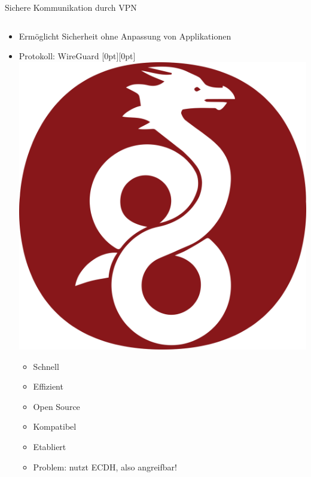 \documentclass{rosenpass-beamer}
\begin{document}
\begin{frame}{Sichere Kommunikation durch VPN}
\begin{columns}[T]
\begin{column}{0.5\textwidth}
\begin{itemize}
\item  Ermöglicht Sicherheit ohne Anpassung von Applikationen
\item  Protokoll: WireGuard \raisebox{\dimexpr-.5\height+.5\ht\strutbox}[0pt][0pt]{\includegraphics[height=1.5\baselineskip]{graphics/wireguard}}

  \begin{itemize}
    \item Schnell
  \item Effizient
  \item Open Source
  \item Kompatibel
  \item Etabliert
  \item Problem: nutzt ECDH, also angreifbar!
  \end{itemize}
\end{itemize}
\end{column}


\end{columns}
\end{frame}
\end{document}
